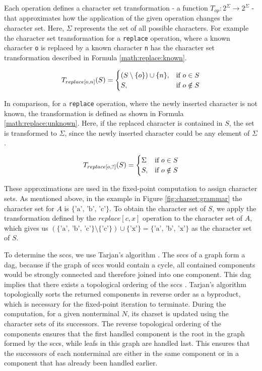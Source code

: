 Each operation defines a character set transformation - a function $T_{op} : 2^\Sigma \rightarrow 2^\Sigma$ - that approximates how the application of the given operation changes the character set. Here, $\Sigma$ represents the set of all possible characters.
For example the character set transformation for a \lstinline|replace| operation, where a known character \lstinline|o| is replaced by a known character \lstinline|n| has the character set transformation described in Formula \ref{math:replace:known}.

\begin{align}
	\centering
	T_{replace[o, n]}(S) = 
	\begin{cases}
		(S \setminus \{o\}) \cup \{n\}, & \text{if } o \in S\\
		S, & \text{if } o \notin S
	\end{cases}
	\label{math:replace:known}
\end{align}

In comparison, for a \lstinline|replace| operation, where the newly inserted character is not known, the transformation is defined as shown in Formula \ref{math:replace:unknown}. Here, if the replaced character is contained in $S$, the set is transformed to $\Sigma$, since the newly inserted character could be any element of $\Sigma$.

\begin{align}
	\centering
	T_{replace[o, ?]}(S) = 
	\begin{cases}
		\Sigma & \text{if } o \in S\\
		S, & \text{if } o \notin S
	\end{cases}
	\label{math:replace:unknown}
\end{align}

These approximations are used in the fixed-point computation to assign character sets.
As mentioned above, in the example in Figure \ref{fig:charset:grammar} the character set for $A$ is $\{\text{'a', 'b', 'c'}\}$. To obtain the character set of $S$, we apply the transformation defined by the $replace[c,x]$ operation to the character set of $A$, which gives us $(\{\text{'a', 'b', 'c'}\} \setminus \{\text{'c'}\}) \cup \{\text{'x'}\} = \{\text{'a', 'b', 'x'}\}$ as the character set of $S$.

To determine the \acp{scc}, we use Tarjan's algorithm \cite{tarjan}.
The \acp{scc} of a graph form a \ac{dag}, because if the graph of \acp{scc} would contain a cycle, all contained components would be strongly connected and therefore joined into one component. This \ac{dag} implies that there exists a topological ordering of the \acp{scc} \cite{mit_algorithms}.
Tarjan's algorithm topologically sorts the returned components in reverse order as a byproduct, which is necessary for the fixed-point iteration to terminate.
During the computation, for a given nonterminal $N$, its charset is updated using the character sets of its successors. The reverse topological ordering of the components ensures that the first handled component is the root in the graph formed by the \acp{scc}, while leafs in this graph are handled last. This ensures that the successors of each nonterminal are either in the same component or in a component that has already been handled earlier.

